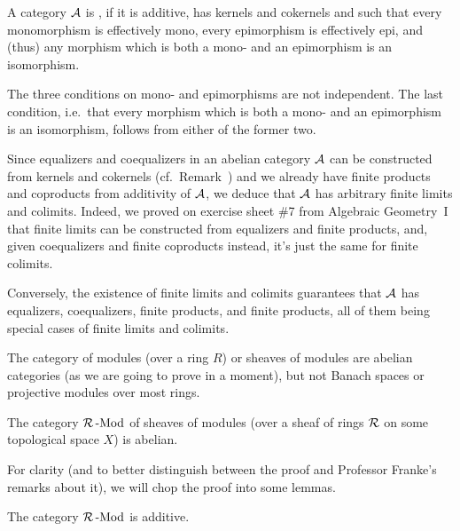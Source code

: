 \documentclass[a4paper,parskip=half,numbers=enddot, DIV=12]{scrreprt}
\begin{document}
\begin{defi}
	A category $\mathcal{A}$ is , if it is additive, has kernels and cokernels and such that every monomorphism is effectively mono, every epimorphism is effectively epi, and (thus) any morphism which is both a mono- and an epimorphism is an isomorphism.
\end{defi}
\begin{rem*}
	\begin{alphanumerate}
		\item The three conditions on mono- and epimorphisms are not independent. The last condition, i.e.\ that every morphism which is both a mono- and an epimorphism is an isomorphism, follows from either of the former two.
		\item Since equalizers and coequalizers in an abelian category $\mathcal{A}$ can be constructed from kernels and cokernels (cf.\ Remark~) and we already have finite products and coproducts from additivity of $\mathcal{A}$, we deduce that $\mathcal{A}$ has arbitrary finite limits and colimits. Indeed, we proved on exercise sheet \#7 from Algebraic Geometry~I that finite limits can be constructed from equalizers and finite products, and, given coequalizers and finite coproducts instead, it's just the same for finite colimits.
		
		Conversely, the existence of finite limits and colimits guarantees that $\mathcal{A}$ has equalizers, coequalizers, finite products, and finite products, all of them being special cases of finite limits and colimits.
	\end{alphanumerate}
	
\end{rem*}
The category of modules (over a ring $R$) or sheaves of modules are abelian categories (as we are going to prove in a moment), but not Banach spaces or projective modules over most rings.
\begin{prop}
	The category $\mathcal{R}\operatorname{-Mod}$ of sheaves of modules (over a sheaf of rings $\mathcal{R}$ on some topological space $X$) is abelian.
\end{prop}
For clarity (and to better distinguish between the proof and Professor Franke's remarks about it), we will chop the proof into some lemmas.
\begin{lem}
	The category $\mathcal{R}\operatorname{-Mod}$ is additive.
\end{lem}
\end{document}
